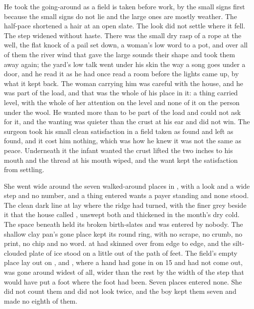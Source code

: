 He took the going-around as a field is taken before work, by the small signs first because the small signs do not lie and the large ones are mostly weather. The half-pace shortened a hair at an open slate. The look did not settle where it fell. The step widened without haste. There was the small dry rasp of a rope at the well, the flat knock of a pail set down, a woman's low word to a pot, and over all of them the river wind that gave the large sounds their shape and took them away again; the yard's low talk went under his skin the way a song goes under a door, and he read it as he had once read a room before the lights came up, by what it kept back. The woman carrying him was careful with the house, and he was part of the load, and that was the whole of his place in it: a thing carried level, with the whole of her attention on the level and none of it on the person under the wool. He wanted more than to be part of the load and could not ask for it, and the wanting was quieter than the crust at his ear and did not win. The surgeon took his small clean satisfaction in a field taken as found and left as found, and it cost him nothing, which was how he knew it was not the same as peace. Underneath it the infant wanted the crust lifted the two inches to his mouth and the thread at his mouth wiped, and the want kept the satisfaction from settling.

She went wide around the seven walked-around places in , with a look and a wide step and no number, and a thing entered wants a payer standing and none stood. The clean dark line at  lay where the ridge had turned, with the finer grey beside it that the house called , unswept both and thickened in the month's dry cold. The space beneath  held its broken birth-slates and was entered by nobody. The shallow clay pan's gone place kept its round ring, with no scrape, no crumb, no print, no chip and no word.  at  had skinned over from edge to edge, and the silt-clouded plate of ice stood on  a little out of the path of feet. The field's empty place lay out on , and , where a hand had gone in on  15 and had not come out, was gone around widest of all, wider than the rest by the width of the step that would have put a foot where the foot had been. Seven places entered none. She did not count them and did not look twice, and the boy kept them seven and made no eighth of them.


